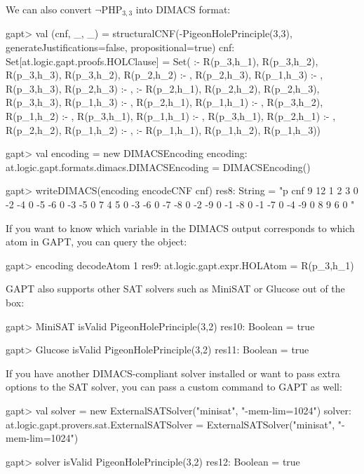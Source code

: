 \documentclass[a4paper,11pt]{article}
\newcommand{\cli}[1]{{\ttfamily {#1}}}
\begin{document}
We can also convert $\neg\mathrm{PHP}_{3,3}$ into DIMACS format:
\begin{clilisting}
gapt> val (cnf, _, _) = structuralCNF(-PigeonHolePrinciple(3,3), generateJustifications=false, propositional=true)
cnf: Set[at.logic.gapt.proofs.HOLClause] = Set( :- R(p_3,h_1), R(p_3,h_2), R(p_3,h_3), R(p_3,h_2), R(p_2,h_2) :- , R(p_2,h_3), R(p_1,h_3) :- , R(p_3,h_3), R(p_2,h_3) :- ,  :- R(p_2,h_1), R(p_2,h_2), R(p_2,h_3), R(p_3,h_3), R(p_1,h_3) :- , R(p_2,h_1), R(p_1,h_1) :- , R(p_3,h_2), R(p_1,h_2) :- , R(p_3,h_1), R(p_1,h_1) :- , R(p_3,h_1), R(p_2,h_1) :- , R(p_2,h_2), R(p_1,h_2) :- ,  :- R(p_1,h_1), R(p_1,h_2), R(p_1,h_3))

gapt> val encoding = new DIMACSEncoding
encoding: at.logic.gapt.formats.dimacs.DIMACSEncoding = DIMACSEncoding()

gapt> writeDIMACS(encoding encodeCNF cnf)
res8: String =
"p cnf 9 12
1 2 3 0
-2 -4 0
-5 -6 0
-3 -5 0
7 4 5 0
-3 -6 0
-7 -8 0
-2 -9 0
-1 -8 0
-1 -7 0
-4 -9 0
8 9 6 0
"

\end{clilisting}

If you want to know which variable in the DIMACS output corresponds to which
atom in GAPT, you can query the \cli{DIMACSEncoding} object:
\begin{clilisting}
gapt> encoding decodeAtom 1
res9: at.logic.gapt.expr.HOLAtom = R(p_3,h_1)

\end{clilisting}

GAPT also supports other SAT solvers such as MiniSAT or Glucose out of the box:
\begin{clilisting}
gapt> MiniSAT isValid PigeonHolePrinciple(3,2)
res10: Boolean = true

\end{clilisting}
\begin{clilisting}
gapt> Glucose isValid PigeonHolePrinciple(3,2)
res11: Boolean = true

\end{clilisting}

If you have another DIMACS-compliant solver installed or want to pass extra
options to the SAT solver, you can pass a custom command to GAPT as well:
\begin{clilisting}
gapt> val solver = new ExternalSATSolver("minisat", "-mem-lim=1024")
solver: at.logic.gapt.provers.sat.ExternalSATSolver = ExternalSATSolver("minisat", "-mem-lim=1024")

gapt> solver isValid PigeonHolePrinciple(3,2)
res12: Boolean = true

\end{clilisting}
\end{document}
